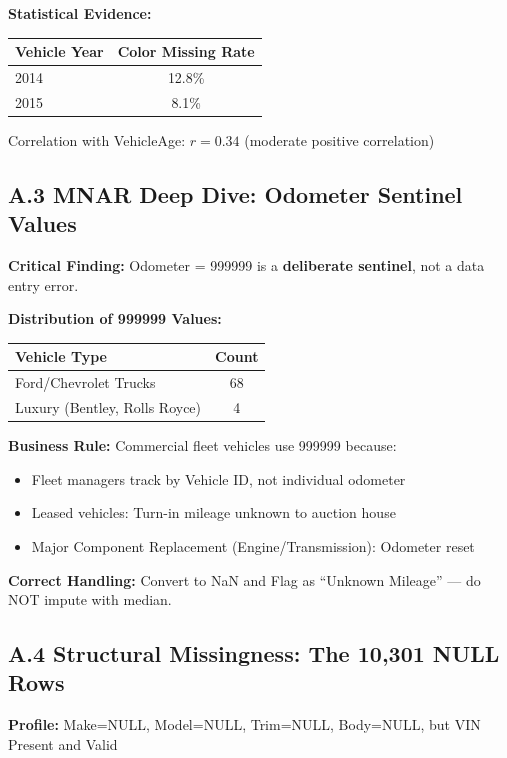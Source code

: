 \documentclass[12pt,a4paper]{article}
\begin{document}
\textbf{Statistical Evidence:}
\begin{center}
\begin{tabular}{lc}
\toprule
\textbf{Vehicle Year} & \textbf{Color Missing Rate} \\
\midrule
2014 & 12.8\% \\
2015 & 8.1\% \\
\bottomrule
\end{tabular}
\end{center}

Correlation with VehicleAge: $r = 0.34$ (moderate positive correlation)

\subsection{A.3 MNAR Deep Dive: Odometer Sentinel Values}

\textbf{Critical Finding:} Odometer = 999999 is a \textbf{deliberate sentinel}, not a data entry error.

\textbf{Distribution of 999999 Values:}
\begin{center}
\begin{tabular}{lc}
\toprule
\textbf{Vehicle Type} & \textbf{Count} \\
\midrule
Ford/Chevrolet Trucks & 68 \\
Luxury (Bentley, Rolls Royce) & 4 \\
\bottomrule
\end{tabular}
\end{center}

\textbf{Business Rule:} Commercial fleet vehicles use 999999 because:
\begin{itemize}
    \item Fleet managers track by Vehicle ID, not individual odometer
    \item Leased vehicles: Turn-in mileage unknown to auction house
    \item Major Component Replacement (Engine/Transmission): Odometer reset
\end{itemize}

\textbf{Correct Handling:} Convert to NaN and Flag as ``Unknown Mileage'' — do NOT impute with median.

\subsection{A.4 Structural Missingness: The 10,301 NULL Rows}

\textbf{Profile:} Make=NULL, Model=NULL, Trim=NULL, Body=NULL, but VIN Present and Valid
\end{document}

